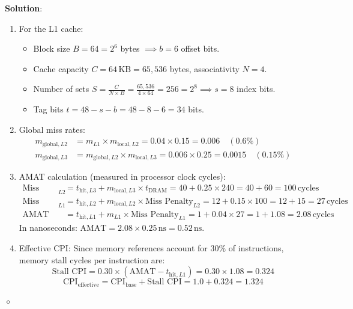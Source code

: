 \begin{problem}
\textbf{Solution}:
\begin{enumerate}
    \item For the L1 cache:
    \begin{itemize}
        \item Block size $B = 64 = 2^6$ bytes $\implies b = 6$ offset bits.
        \item Cache capacity $C = 64\,\text{KB} = 65{,}536$ bytes, associativity $N = 4$.
        \item Number of sets $S = \frac{C}{N \times B} = \frac{65{,}536}{4 \times 64} = 256 = 2^8 \implies s = 8$ index bits.
        \item Tag bits $t = 48 - s - b = 48 - 8 - 6 = 34$ bits.
    \end{itemize}
    \item Global miss rates:
    \begin{align*}
    m_{\text{global}, L2} &= m_{L1} \times m_{\text{local}, L2} = 0.04 \times 0.15 = 0.006 \quad (0.6\%) \\
    m_{\text{global}, L3} &= m_{\text{global}, L2} \times m_{\text{local}, L3} = 0.006 \times 0.25 = 0.0015 \quad (0.15\%)
    \end{align*}
    \item AMAT calculation (measured in processor clock cycles):
    \begin{align*}
    \text{Miss Penalty}_{L2} &= t_{\text{hit}, L3} + m_{\text{local}, L3} \times t_{\text{DRAM}} = 40 + 0.25 \times 240 = 40 + 60 = 100\,\text{cycles} \\
    \text{Miss Penalty}_{L1} &= t_{\text{hit}, L2} + m_{\text{local}, L2} \times \text{Miss Penalty}_{L2} = 12 + 0.15 \times 100 = 12 + 15 = 27\,\text{cycles} \\
    \text{AMAT} &= t_{\text{hit}, L1} + m_{L1} \times \text{Miss Penalty}_{L1} = 1 + 0.04 \times 27 = 1 + 1.08 = 2.08\,\text{cycles}
    \end{align*}
    In nanoseconds: $\text{AMAT} = 2.08 \times 0.25\,\text{ns} = 0.52\,\text{ns}$.
    \item Effective CPI:
    Since memory references account for $30\%$ of instructions, memory stall cycles per instruction are:
    \[
    \text{Stall CPI} = 0.30 \times (\text{AMAT} - t_{\text{hit}, L1}) = 0.30 \times 1.08 = 0.324
    \]
    \[
    \text{CPI}_{\text{effective}} = \text{CPI}_{\text{base}} + \text{Stall CPI} = 1.0 + 0.324 = \mathbf{1.324}
    \]
\end{enumerate}
$\diamond$
\end{problem}


